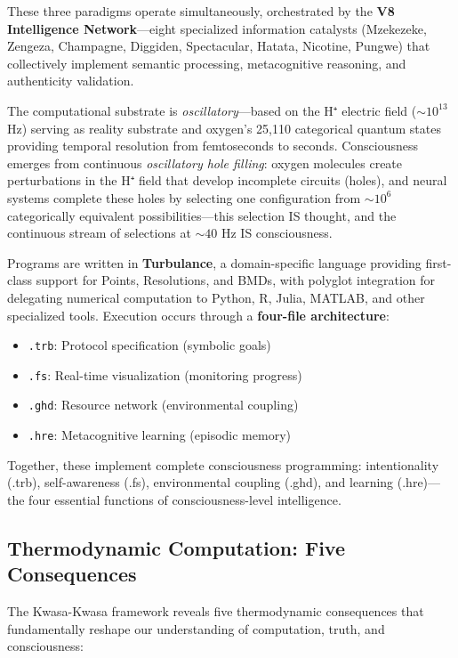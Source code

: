 These three paradigms operate simultaneously, orchestrated by the \textbf{V8 Intelligence Network}—eight specialized information catalysts (Mzekezeke, Zengeza, Champagne, Diggiden, Spectacular, Hatata, Nicotine, Pungwe) that collectively implement semantic processing, metacognitive reasoning, and authenticity validation.

The computational substrate is \textit{oscillatory}—based on the H⁺ electric field ($\sim 10^{13}$ Hz) serving as reality substrate and oxygen's 25,110 categorical quantum states providing temporal resolution from femtoseconds to seconds. Consciousness emerges from continuous \textit{oscillatory hole filling}: oxygen molecules create perturbations in the H⁺ field that develop incomplete circuits (holes), and neural systems complete these holes by selecting one configuration from $\sim 10^6$ categorically equivalent possibilities—this selection IS thought, and the continuous stream of selections at $\sim 40$ Hz IS consciousness.

Programs are written in \textbf{Turbulance}, a domain-specific language providing first-class support for Points, Resolutions, and BMDs, with polyglot integration for delegating numerical computation to Python, R, Julia, MATLAB, and other specialized tools. Execution occurs through a \textbf{four-file architecture}:
\begin{itemize}
\item \texttt{.trb}: Protocol specification (symbolic goals)
\item \texttt{.fs}: Real-time visualization (monitoring progress)
\item \texttt{.ghd}: Resource network (environmental coupling)
\item \texttt{.hre}: Metacognitive learning (episodic memory)
\end{itemize}

Together, these implement complete consciousness programming: intentionality (.trb), self-awareness (.fs), environmental coupling (.ghd), and learning (.hre)—the four essential functions of consciousness-level intelligence.

\subsection{Thermodynamic Computation: Five Consequences}

The Kwasa-Kwasa framework reveals five thermodynamic consequences that fundamentally reshape our understanding of computation, truth, and consciousness:

